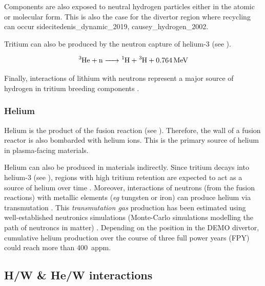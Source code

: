 Components are also exposed to neutral hydrogen particles either in the atomic or molecular form.
This is also the case for the divertor region where recycling can occur sidecite{denis_dynamic_2019, causey_hydrogen_2002}.

Tritium can also be produced by the neutron capture of helium-3  (see ).

\begin{equation}
    \ce{^3He + n -> ^1H + ^3H + \SI{0.764}{MeV}}
    \labeq{he3 neutron capture reaction}
\end{equation}

Finally, interactions of lithium with neutrons represent a major source of hydrogen in tritium breeding components .

\subsubsection{Helium}
Helium is the product of the fusion reaction (see ).
Therefore, the wall of a fusion reactor is also bombarded with helium ions.
This is the primary source of helium in plasma-facing materials.

Helium can also be produced in materials indirectly.
Since tritium decays into helium-3 (see ), regions with high tritium retention are expected to act as a source of helium over time \cite{shimada_tritium_2017}.
Moreover, interactions of neutrons (from the fusion reactions) with metallic elements (\textit{eg} tungsten or iron) can produce helium via transmutation .
This \textit{transmutation gas} production has been estimated using well-established neutronics simulations (Monte-Carlo simulations modelling the path of neutroncs in matter) .
Depending on the position in the DEMO divertor, cumulative helium production over the course of three full power years (FPY) could reach more than \SI{400}{appm}.


\subsection{H/W \& He/W interactions}


